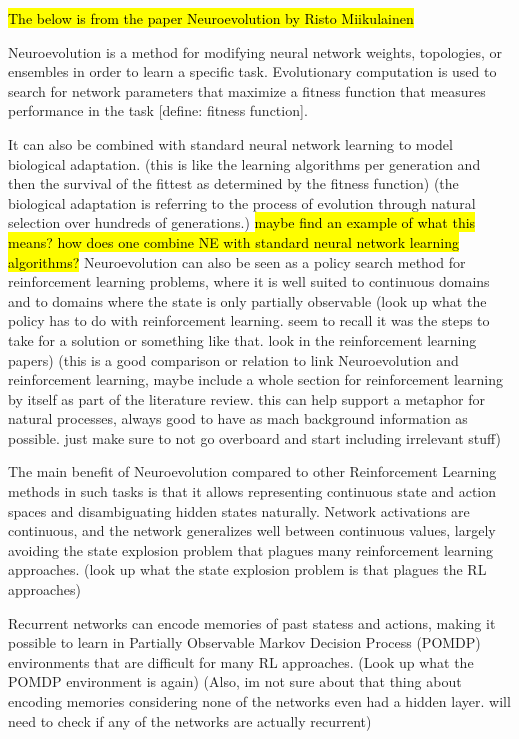 \documentclass[conference]{IEEEtran}
\begin{document}
\hl{The below is from the paper Neuroevolution by Risto Miikulainen}

Neuroevolution is a method for modifying neural network weights, topologies, or ensembles in order to learn a specific task.
Evolutionary computation is used to search for network parameters that maximize a fitness function that measures performance in the task [define: fitness function].

It can also be combined with standard neural network learning to model biological adaptation. (this is like the learning algorithms per generation and then the survival of the fittest as determined by the fitness function)
(the biological adaptation is referring to the process of evolution through natural selection over hundreds of generations.)
\hl{maybe find an example of what this means? how does one combine NE with standard neural network learning algorithms?}
Neuroevolution can also be seen as a policy search method for reinforcement learning problems, where it is well suited to continuous domains and to domains where the state is only partially observable
(look up what the policy has to do with reinforcement learning. seem to recall it was the steps to take for a solution or something like that. look in the reinforcement learning papers)
(this is a good comparison or relation to link Neuroevolution and reinforcement learning, maybe include a whole section for reinforcement learning by itself as part of the literature review. this can help support a metaphor for natural processes, always good to have as mach background information as possible. just make sure to not go overboard and start including irrelevant stuff)

The main benefit of Neuroevolution compared  to other Reinforcement Learning methods in such tasks is that it allows representing continuous state and action spaces and disambiguating hidden states naturally.
Network activations are continuous, and the network generalizes well between continuous values, largely avoiding the state explosion problem that plagues many reinforcement learning approaches.
(look up what the state explosion problem is that plagues the RL approaches)

Recurrent networks can encode memories of past statess and actions, making it possible to learn in Partially Observable Markov Decision Process (POMDP) environments that are difficult for many RL approaches.
(Look up what the POMDP environment is again)
(Also, im not sure about that thing about encoding memories considering none of the networks even had a hidden layer. will need to check if any of the networks are actually recurrent)
\end{document}
